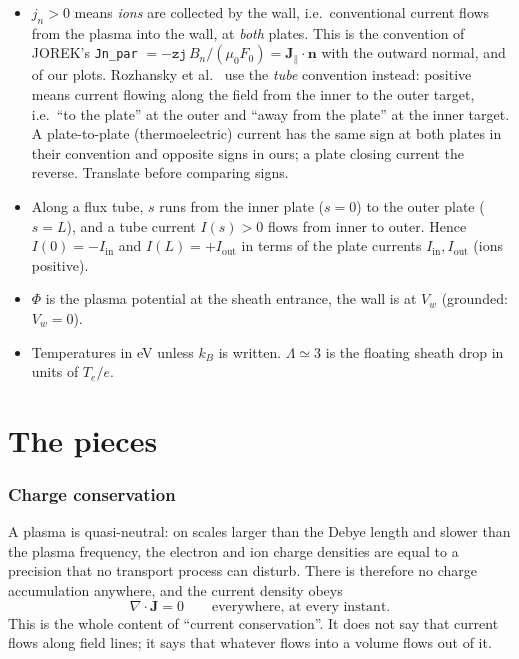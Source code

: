 \documentclass[11pt,a4paper]{article}
\newcommand{\bJ}{\mathbf{J}}
\newcommand{\bn}{\mathbf{n}}
\newcommand{\divg}{\nabla\!\cdot\!}
\newcommand{\Te}{T_e}
\newcommand{\code}[1]{\texttt{#1}}
\begin{document}
\begin{tcolorbox}[key={Sign conventions used throughout}]
\begin{itemize}
\item $j_n > 0$ means \emph{ions} are collected by the wall, i.e.\ conventional current flows from the plasma into
      the wall, at \emph{both} plates. This is the convention of JOREK's \code{Jn\_par} $= -\code{zj}\,B_n/(\mu_0F_0)
      = \bJ_\parallel\cdot\bn$ with the outward normal, and of our plots. Rozhansky et al.\ \cite{rozhansky2020} use the
      \emph{tube} convention instead: positive means current flowing along the field from the inner to the outer
      target, i.e.\ ``to the plate'' at the outer and ``away from the plate'' at the inner target. A plate-to-plate
      (thermoelectric) current has the same sign at both plates in their convention and opposite signs in ours; a plate
      closing current the reverse. Translate before comparing signs.
\item Along a flux tube, $s$ runs from the inner plate ($s=0$) to the outer plate ($s=L$), and a tube current
      $I(s) > 0$ flows from inner to outer. Hence $I(0) = -I_{\mathrm{in}}$ and $I(L) = +I_{\mathrm{out}}$ in terms of
      the plate currents $I_{\mathrm{in}}, I_{\mathrm{out}}$ (ions positive).
\item $\Phi$ is the plasma potential at the sheath entrance, the wall is at $V_w$ (grounded: $V_w = 0$).
\item Temperatures in eV unless $k_B$ is written. $\Lambda \simeq 3$ is the floating sheath drop in units of $\Te/e$.
\end{itemize}
\end{tcolorbox}

\part{The pieces}

\section{Charge conservation}

A plasma is quasi-neutral: on scales larger than the Debye length and slower than the plasma frequency, the electron
and ion charge densities are equal to a precision that no transport process can disturb. There is therefore no
charge accumulation anywhere, and the current density obeys
\begin{equation}
  \divg\bJ = 0 \qquad\text{everywhere, at every instant.}
  \label{eq:divj}
\end{equation}
This is the whole content of ``current conservation''. It does not say that current flows along field lines; it says
that whatever flows into a volume flows out of it.
\end{document}
